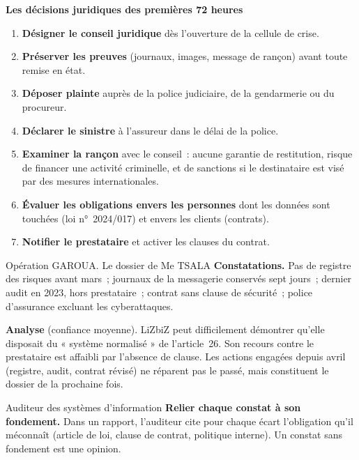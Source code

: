 \begin{boxprocedure}
\textbf{Les décisions juridiques des premières 72 heures}
\begin{enumerate}
    \item \textbf{Désigner le conseil juridique} dès l'ouverture de la
          cellule de crise.
    \item \textbf{Préserver les preuves} (journaux, images, message de
          rançon) avant toute remise en état.
    \item \textbf{Déposer plainte} auprès de la police judiciaire, de la
          gendarmerie ou du procureur.
    \item \textbf{Déclarer le sinistre} à l'assureur dans le délai de la
          police.
    \item \textbf{Examiner la rançon} avec le conseil~: aucune garantie de
          restitution, risque de financer une activité criminelle, et de
          sanctions si le destinataire est visé par des mesures
          internationales.
    \item \textbf{Évaluer les obligations envers les personnes} dont les
          données sont touchées (loi n°~2024/017) et envers les clients
          (contrats).
    \item \textbf{Notifier le prestataire} et activer les clauses du
          contrat.
\end{enumerate}
\end{boxprocedure}

\begin{boxscenario}{Opération GAROUA. Le dossier de Me TSALA}
\textbf{Constatations.} Pas de registre des risques avant mars~; journaux
de la messagerie conservés sept jours~; dernier audit en 2023, hors
prestataire~; contrat sans clause de sécurité~; police d'assurance
excluant les cyberattaques.

\medskip
\textbf{Analyse} (confiance moyenne). LiZbiZ peut difficilement démontrer
qu'elle disposait du « système normalisé » de l'article~26. Son recours
contre le prestataire est affaibli par l'absence de clause. Les actions
engagées depuis avril (registre, audit, contrat révisé) ne réparent pas le
passé, mais constituent le dossier de la prochaine fois.
\end{boxscenario}

\begin{boxmetier}{Auditeur des systèmes d'information}
\textbf{Relier chaque constat à son fondement.} Dans un rapport, l'auditeur
cite pour chaque écart l'obligation qu'il méconnaît (article de loi,
clause de contrat, politique interne). Un constat sans fondement est une
opinion.
\end{boxmetier}

